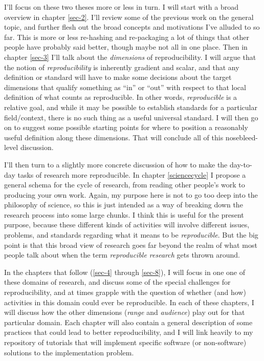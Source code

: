 \documentclass{book}
\begin{document}
I'll focus on these two theses more or less in turn.  I will start with a broad overview in chapter \ref{sec-2}. I'll review some of the previous work on the general topic, and further flesh out the broad concepts and motivations I've alluded to so far. This is more or less re-hashing and re-packaging a lot of things that other people have probably said better, though maybe not all in one place. Then in chapter \ref{sec-3} I'll talk about the \emph{dimensions} of reproducibility. I will argue that the notion of \emph{reproducibility} is inherently gradient and scalar, and that any definition or standard will have to make some decisions about the target dimensions that qualify something as ``in'' or ``out'' with respect to that local definition of what counts as reproducible. In other words, \emph{reproducible} is a relative goal, and while it may be possible to establish standards for a particular field/context, there is no such thing as a useful universal standard. I will then go on to suggest some possible starting points for where to position a reasonably useful definition along these dimensions. That will conclude all of this nosebleed-level discussion.

I'll then turn to a slightly more concrete discussion of how to make the day-to-day tasks of research more reproducible. In chapter \ref{sciencecycle} I propose a general schema for the cycle of research, from reading other people's work to producing your own work.  Again, my purpose here is not to go too deep into the philosophy of science, so this is just intended as a way of breaking down the research process into some large chunks. I think this is useful for the present purpose, because these different kinds of activities will involve different issues, problems, and standards regarding what it means to be \emph{reproducible}. But the big point is that this broad view of research goes far beyond the realm of what most people talk about when the term \emph{reproducible research} gets thrown around. 

In the chapters that follow (\ref{sec-4} through \ref{sec-8}), I will focus in one one of these domains of research, and discuss some of the special challenges for reproducibility, and at times grapple with the question of whether (and how) activities in this domain could ever be reproducible. In each of these chapters, I will discuss how the other dimensions (\emph{range} and \emph{audience}) play out for that particular domain. Each chapter will also contain a general description of some practices that could lead to better reproducibility, and I will link heavily to my repository of tutorials that will implement specific software (or non-software) solutions to the implementation problem.
\end{document}
